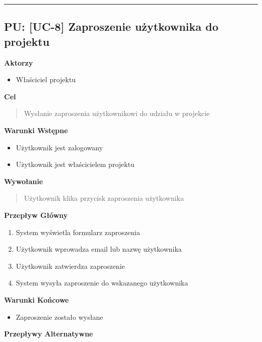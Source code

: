 \hrule
\vspace{1cm}

\subsection*{PU: [UC-8] Zaproszenie użytkownika do projektu}

\noindent\textbf{Aktorzy}
\begin{itemize}
    \item Właściciel projektu
\end{itemize}

\vspace{0.2cm}
\noindent\textbf{Cel}
\begin{quote}
    Wysłanie zaproszenia użytkownikowi do udziału w projekcie
\end{quote}

\vspace{0.2cm}
\noindent\textbf{Warunki Wstępne}
\begin{itemize}
    \item Użytkownik jest zalogowany
    \item Użytkownik jest właścicielem projektu
\end{itemize}

\vspace{0.2cm}
\noindent\textbf{Wywołanie}
\begin{quote}
    Użytkownik klika przycisk zaproszenia użytkownika
\end{quote}

\vspace{0.2cm}
\noindent\textbf{Przepływ Główny}
\begin{enumerate}
    \item System wyświetla formularz zaproszenia
    \item Użytkownik wprowadza email lub nazwę użytkownika
    \item Użytkownik zatwierdza zaproszenie
    \item System wysyła zaproszenie do wskazanego użytkownika
\end{enumerate}

\vspace{0.2cm}
\noindent\textbf{Warunki Końcowe}
\begin{itemize}
    \item Zaproszenie zostało wysłane
\end{itemize}

\vspace{0.2cm}
\noindent\textbf{Przepływy Alternatywne}

